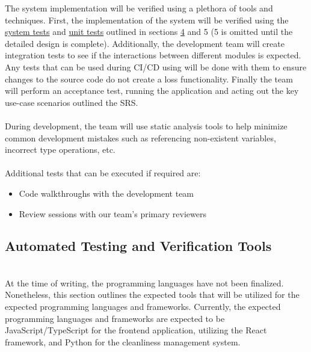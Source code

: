 \documentclass[12pt, titlepage]{article}
\begin{document}
The system implementation will be verified using a plethora of tools and techniques. First, the implementation of the system will be verified using the \hyperref[section:systemTests]{system tests} and \hyperref[section:unitTests]{unit tests} outlined in sections \hyperref[section:systemTests]{4} and 5 (5 is omitted until the detailed design is complete). Additionally, the development team will create integration tests to see if the interactions between different modules is expected. Any tests that can be used during CI/CD using will be done with them to ensure changes to the source code do not create a loss functionality. Finally the team will perform an acceptance test, running the application and acting out the key use-case scenarios outlined the SRS.\\
\\
During development, the team will use static analysis tools to help minimize common development mistakes such as referencing non-existent variables, incorrect type operations, etc.\\
\\ Additional tests that can be executed if required are:
\begin{itemize}
\item Code walkthroughs with the development team
\item Review sessions with our team's primary reviewers
\end{itemize}

\subsection{Automated Testing and Verification Tools}
\label{subsec:tools}


\\ 
  At the time of writing, the programming languages have not been finalized. Nonetheless, this section outlines the expected tools that will be utilized for the expected programming languages and frameworks. Currently, the expected programming languages and frameworks are expected to be JavaScript/TypeScript for the frontend application, utilizing the React framework, and Python for the cleanliness management system.
  
\end{document}
